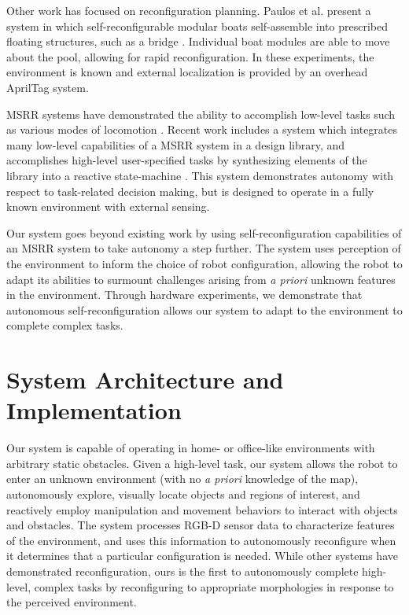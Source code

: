 \documentclass[journal]{IEEEtran}
\begin{document}
Other work has focused on reconfiguration planning.  Paulos et al. present a system in which self-reconfigurable modular boats self-assemble into prescribed floating structures, such as a bridge \cite{Paulos2015}.  Individual boat modules are able to move about the pool, allowing for rapid reconfiguration.  In these experiments, the environment is known and external localization is provided by an overhead AprilTag system. 

MSRR systems have demonstrated the ability to accomplish low-level tasks such as various modes of locomotion \cite{Yim1994}.
Recent work includes a system which integrates many low-level capabilities of a MSRR system in a design library, and accomplishes high-level user-specified tasks by synthesizing elements of the library into a reactive state-machine \cite{Jing2016}. This system demonstrates autonomy with respect to task-related decision making, but is designed to operate in a fully known environment with external sensing.

Our system goes beyond existing work by using self-reconfiguration capabilities of an MSRR system to take autonomy a step further.  The system uses perception of the environment to inform the choice of robot configuration, allowing the robot to adapt its abilities to surmount challenges arising from \textit{a priori} unknown features in the environment. Through hardware experiments, we demonstrate that autonomous self-reconfiguration allows our system to adapt to the environment to complete complex tasks.

\section{System Architecture and Implementation}\label{sec:system}
%
%
Our system is capable of operating in home- or office-like environments with arbitrary static obstacles. Given a high-level task, our system allows the robot to enter an unknown environment (with no \textit{a priori} knowledge of the map), autonomously explore, visually locate objects and regions of interest, and reactively employ manipulation and movement behaviors to interact with objects and obstacles. The system processes RGB-D sensor data to characterize features of the environment, and uses this information to autonomously reconfigure when it determines that a particular configuration is needed.
While other systems have demonstrated reconfiguration, ours is the first to autonomously complete high-level, complex tasks by reconfiguring to appropriate morphologies in response to the perceived environment.
\end{document}

